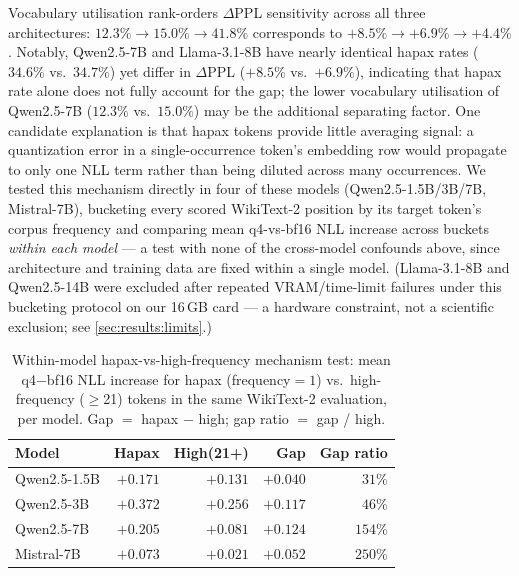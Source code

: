 \documentclass[10pt,twocolumn]{article}
\begin{document}
Vocabulary utilisation rank-orders $\Delta$PPL sensitivity across all three
architectures: $12.3\% \to 15.0\% \to 41.8\%$ corresponds to
$+8.5\% \to +6.9\% \to +4.4\%$.  Notably, Qwen2.5-7B and Llama-3.1-8B have
nearly identical hapax rates ($34.6\%$ vs.\ $34.7\%$) yet differ in
$\Delta$PPL ($+8.5\%$ vs.\ $+6.9\%$), indicating that hapax rate alone does
not fully account for the gap; the lower vocabulary utilisation of
Qwen2.5-7B ($12.3\%$ vs.\ $15.0\%$) may be the additional separating factor.
One candidate explanation is that hapax tokens provide little averaging
signal: a quantization error in a single-occurrence token's embedding row
would propagate to only one NLL term rather than being diluted across many
occurrences.  We tested this mechanism directly in four of these models
(Qwen2.5-1.5B/3B/7B, Mistral-7B), bucketing every scored WikiText-2 position
by its target token's corpus frequency and comparing mean q4-vs-bf16 NLL
increase across buckets \emph{within each model} --- a test with none of the
cross-model confounds above, since architecture and training data are fixed
within a single model.  (Llama-3.1-8B and Qwen2.5-14B were excluded after
repeated VRAM/time-limit failures under this bucketing protocol on our
16\,GB card --- a hardware constraint, not a scientific exclusion; see
\cref{sec:results:limits}.)

\begin{table}[t]
  \centering
  \caption{Within-model hapax-vs-high-frequency mechanism test: mean
    q4$-$bf16 NLL increase for hapax (frequency$=1$) vs.\ high-frequency
    ($\geq$21) tokens in the same WikiText-2 evaluation, per model.  Gap
    $=$ hapax $-$ high; gap ratio $=$ gap / high.}
  \label{tab:hapax}
  \begin{tabular}{lrrrr}
    \toprule
    Model & Hapax & High(21+) & Gap & Gap ratio \\
    \midrule
    Qwen2.5-1.5B & $+0.171$ & $+0.131$ & $+0.040$ & $31\%$ \\
    Qwen2.5-3B   & $+0.372$ & $+0.256$ & $+0.117$ & $46\%$ \\
    Qwen2.5-7B   & $+0.205$ & $+0.081$ & $+0.124$ & $154\%$ \\
    Mistral-7B   & $+0.073$ & $+0.021$ & $+0.052$ & $250\%$ \\
    \bottomrule
  \end{tabular}
\end{table}
\end{document}
